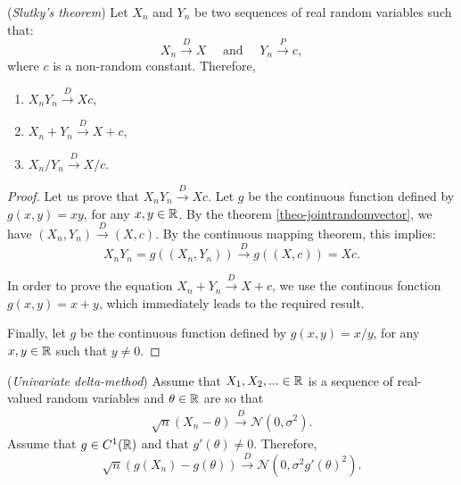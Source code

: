 \documentclass{article}
\begin{document}

\begin{theorem}
(\emph{Slutky's theorem})
Let $X_n$ and $Y_n$ be two sequences of real random variables such that:
$$
X_n \xrightarrow{D} X \quad \textrm{ and } \quad Y_n \xrightarrow{P} c,
$$
where $c$ is a non-random constant. 
Therefore, 
\begin{enumerate}
\item $X_n Y_n \xrightarrow{D} X c  $,
\item $X_n + Y_n \xrightarrow{D} X + c$,
\item $X_n / Y_n \xrightarrow{D} X / c$.
\end{enumerate}
\end{theorem}

\begin{proof}
Let us prove that  $X_n Y_n \xrightarrow{D} X c$. 
Let $g$ be the continuous function defined by $g(x,y)=x y$, for any $x,y\in\mathbb{R}$. 
By the theorem \ref{theo-jointrandomvector}, we have $(X_n,Y_n) \xrightarrow{D} (X, c)$. 
By the continuous mapping theorem, this implies:
$$
X_n Y_n = g((X_n,Y_n)) \xrightarrow{D} g((X,c)) = X  c. 
$$

In order to prove the equation $X_n + Y_n \xrightarrow{D} X + c$, we use the 
continous fonction $g(x,y)=x + y$, which immediately leads to the required result. 

Finally, let $g$ be the continuous function defined by $g(x,y)=x / y$, for any $x,y\in\mathbb{R}$ such that $y\neq 0$. 
\end{proof}

\begin{theorem}
(\emph{Univariate delta-method})
Assume that $X_1,X_2,...\in\mathbb{R}$ is a sequence of real-valued random variables 
and $\theta\in\mathbb{R}$ are so that 
\begin{align}
\label{eq-delmeth1}
\sqrt{n} (X_n - \theta) \xrightarrow{D} \mathcal{N}(0,\sigma^2).
\end{align}
Assume that $g\in C^1(\mathbb{R})$ and that $g'(\theta)\neq 0$. 
Therefore, 
$$
\sqrt{n} (g(X_n) - g(\theta)) \xrightarrow{D} \mathcal{N}(0,\sigma^2 g'(\theta)^2).
$$
\end{theorem}
\end{document}
